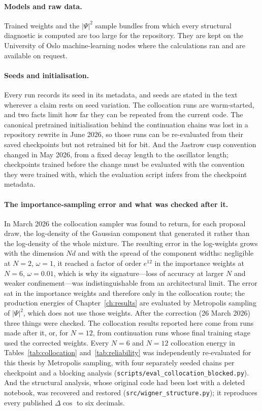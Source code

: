 \paragraph{Models and raw data.} Trained weights and the $|\Psi|^2$ sample bundles from
which every structural diagnostic is computed are too large for the repository. They are kept
on the University of Oslo machine-learning nodes where the calculations ran and are available
on request.

\paragraph{Seeds and initialisation.} Every run records its seed in its metadata, and seeds
are stated in the text wherever a claim rests on seed variation. The collocation runs are
warm-started, and two facts limit how far they can be repeated from the current code. The
canonical pretrained initialisation behind the continuation chains was lost in a repository
rewrite in June 2026, so those runs can be re-evaluated from their saved checkpoints but not
retrained bit for bit. And the Jastrow cusp convention changed in May 2026, from a fixed
decay length to the oscillator length; checkpoints trained before the change must be
evaluated with the convention they were trained with, which the evaluation script infers from
the checkpoint metadata.

\paragraph{The importance-sampling error and what was checked after it.} In March 2026 the
collocation sampler was found to return, for each proposal draw, the log-density of the
Gaussian component that generated it rather than the log-density of the whole mixture. The
resulting error in the log-weights grows with the dimension $Nd$ and with the spread of the
component widths: negligible at $N{=}2$, $\omega=1$, it reached a factor of order $e^{12}$ in
the importance weights at $N{=}6$, $\omega=0.01$, which is why its signature---loss of
accuracy at larger $N$ and weaker confinement---was indistinguishable from an architectural
limit. The error sat in the importance weights and therefore only in the collocation route;
the production energies of Chapter~\ref{ch:results} are evaluated by Metropolis sampling of
$|\Psi|^2$, which does not use those weights. After the correction (26 March 2026) three
things were checked. The collocation results reported here come from runs made after it, or,
for $N{=}12$, from continuation runs whose final training stage used the corrected weights.
Every $N{=}6$ and $N{=}12$ collocation energy in Tables~\ref{tab:collocation}
and~\ref{tab:reliability} was independently re-evaluated for this thesis by Metropolis
sampling, with four separately seeded chains per checkpoint and a blocking analysis
(\texttt{scripts/eval\_collocation\_blocked.py}). And the structural analysis, whose
original code had been lost with a deleted notebook, was recovered and restored
(\texttt{src/wigner\_structure.py}); it reproduces every published $\Delta\cos$ to six
decimals.

